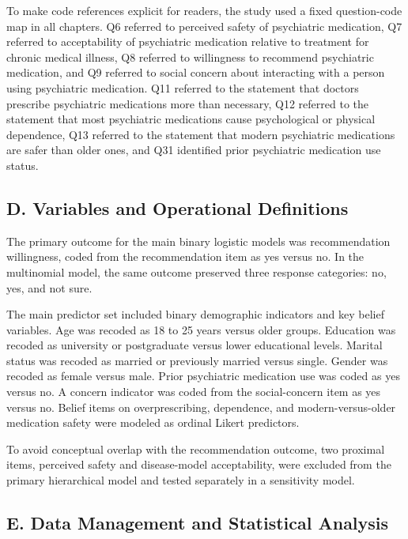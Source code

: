To make code references explicit for readers, the study used a fixed
question-code map in all chapters. Q6 referred to perceived safety of
psychiatric medication, Q7 referred to acceptability of psychiatric
medication relative to treatment for chronic medical illness, Q8
referred to willingness to recommend psychiatric medication, and Q9
referred to social concern about interacting with a person using
psychiatric medication. Q11 referred to the statement that doctors
prescribe psychiatric medications more than necessary, Q12 referred to
the statement that most psychiatric medications cause psychological or
physical dependence, Q13 referred to the statement that modern
psychiatric medications are safer than older ones, and Q31 identified
prior psychiatric medication use status.

\subsection{D. Variables and Operational
Definitions}\label{d.-variables-and-operational-definitions}

The primary outcome for the main binary logistic models was
recommendation willingness, coded from the recommendation item as yes
versus no. In the multinomial model, the same outcome preserved three
response categories: no, yes, and not sure.

The main predictor set included binary demographic indicators and key
belief variables. Age was recoded as 18 to 25 years versus older groups.
Education was recoded as university or postgraduate versus lower
educational levels. Marital status was recoded as married or previously
married versus single. Gender was recoded as female versus male. Prior
psychiatric medication use was coded as yes versus no. A concern
indicator was coded from the social-concern item as yes versus no.
Belief items on overprescribing, dependence, and modern-versus-older
medication safety were modeled as ordinal Likert predictors.

To avoid conceptual overlap with the recommendation outcome, two
proximal items, perceived safety and disease-model acceptability, were
excluded from the primary hierarchical model and tested separately in a
sensitivity model.

\subsection{E. Data Management and Statistical
Analysis}\label{e.-data-management-and-statistical-analysis}

